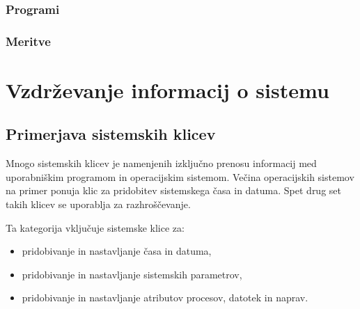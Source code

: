 \documentclass[a4paper,12pt,openright]{book}
\begin{document}
\subsection{Programi}

\subsection{Meritve}

\chapter{Vzdrževanje informacij o sistemu}

\section{Primerjava sistemskih klicev}

Mnogo sistemskih klicev je namenjenih izključno prenosu informacij med uporabniškim programom in operacijskim sistemom.
Večina operacijskih sistemov na primer ponuja klic za pridobitev sistemskega časa in datuma.
Spet drug set takih klicev se uporablja za razhroščevanje.

Ta kategorija vključuje sistemske klice za:
\begin{itemize}
	\item pridobivanje in nastavljanje časa in datuma,
	\item pridobivanje in nastavljanje sistemskih parametrov,
	\item pridobivanje in nastavljanje atributov procesov, datotek in naprav. \cite{Silberschatz_Galvin_Gagne_2018}
\end{itemize}
\end{document}

